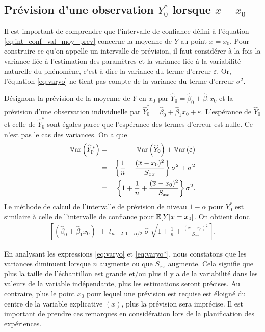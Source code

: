  \subsection{Prévision d'une observation $Y_0^*$ lorsque $x=x_0$}

Il est important de comprendre que l'intervalle de confiance défini à l'équation \eqref{eq:int_conf_val_moy_prev} concerne la moyenne de $Y$ au point $x=x_0$. Pour construire ce qu'on appelle un intervalle de prévision, il faut considérer à la fois la variance liée à l'estimation des paramètres et la variance liée à la variabilité naturelle du phénomène, c'est-à-dire la variance du terme d'erreur $\varepsilon$. Or, l'équation \eqref{eq:varyo} ne tient pas compte de la variance du terme d'erreur $\sigma^2$.

Désignons la prévision de la moyenne de $Y$ en  $x_0$ par $\widehat{Y}_0 = \widehat{\beta}_0 + \widehat{\beta}_1 x_0$ et la prévision d'une observation individuelle par $\widehat{Y}_0^* = \widehat{\beta}_0 + \widehat{\beta}_1 x_0 + \varepsilon$. L'espérance de $\widehat{Y}_0$ et celle de $\widehat{Y}_0^*$ sont égales parce que l'espérance des termes d'erreur est nulle. Ce n'est pas le cas des variances.
On a que
\begin{eqnarray}
 \mathbb{V}\text{ar}\left(\widehat{Y}_0^*\right) &=& \mathbb{V}\text{ar}\left(\widehat{Y}_0\right) + \mathbb{V}\text{ar} \left(\varepsilon\right) \nonumber\\
 &=&\left\{ \frac{1}{n} + \frac{(\overline{x}-x_0)^2}{S_{xx}}\right\} \sigma^2 + \sigma^2 \nonumber\\
 &=& \left\{1+\frac{1}{n} + \frac{(\overline{x}-x_0)^2}{S_{xx}} \right\} \sigma^2.
 \label{eq:varyo*}
\end{eqnarray}
Le méthode de calcul de l'intervalle de prévision de niveau $1-\alpha$ pour ${Y}_0^*$ est similaire à celle de l'intervalle de confiance pour  $\mathbb{E}[Y|x=x_0]$. On obtient donc
\begin{eqnarray}
\left[\left(\widehat{\beta}_0 + \widehat{\beta}_1 x_0\right)\; \pm\; t_{n-2; 1-\alpha/2} \; \widehat\sigma \; \sqrt{1+\frac{1}{n}+\frac{(\overline x-x_0)^2}{S_{xx}}} \right].
\label{eq:int_prev}
\end{eqnarray}


En analysant les expressions \eqref{eq:varyo} et \eqref{eq:varyo*}, nous constatons que les variances diminuent lorsque $n$ augmente ou que $S_{xx}$ augmente. Cela signifie que plus la taille de l'échantillon est grande et/ou plus il y a de la variabilité dans les valeurs de la variable indépendante, plus les estimations seront précises. Au contraire, plus le point $x_0$ pour lequel une prévision est requise est éloigné du centre  de la variable explicative $(\overline x)$, plus la prévision sera imprécise.
Il est important de prendre ces remarques en considération lors de la planification des expériences.


